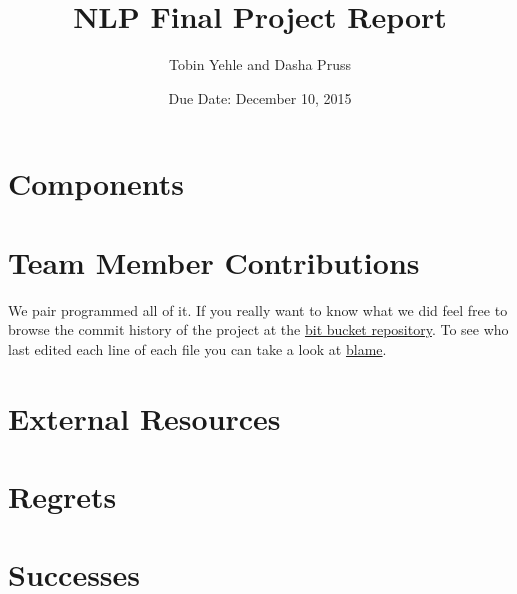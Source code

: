 \documentclass[twoside,12pt]{article}
\newcommand{\class}{NLP}
\newcommand{\name}{Final Project Report}
\newcommand{\due}{December 10, 2015}
\begin{document}
\date{Due Date: \due}
\title{\class{} \name}
\author{ Tobin Yehle and Dasha Pruss }
\maketitle


\section{Components}



\section{Team Member Contributions}
We pair programmed all of it. If you really want to know what we did feel free to browse the commit history of the project at the \href{https://bitbucket.org/tobinyehle/sherlock}{bit bucket repository}. To see who last edited each line of each file you can take a look at \href{https://bitbucket.org/tobinyehle/sherlock/annotate/e57a8467bc90e614b13ca2c99f0b5d681baa65c9/src/cs/utah/sherlock/Sherlock.java?at=default&fileviewer=file-view-default}{blame}.


\section{External Resources}

\section{Regrets}

\section{Successes}
\end{document}
